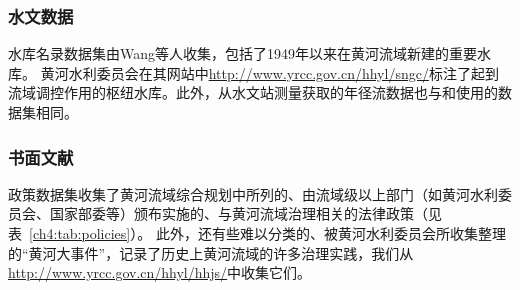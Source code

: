 \subsubsection*{水文数据}
水库名录数据集由Wang等人\cite{wang2019c}收集，包括了1949年以来在黄河流域新建的重要水库。
黄河水利委员会在其网站中\url{http://www.yrcc.gov.cn/hhyl/sngc/}标注了起到流域调控作用的枢纽水库。此外，从水文站测量获取的年径流数据也与\cite{wang2019c}和\cite{wang2016e}使用的数据集相同。

\subsubsection*{书面文献}

政策数据集收集了黄河流域综合规划中所列的、由流域级以上部门（如黄河水利委员会、国家部委等）颁布实施的、与黄河流域治理相关的法律政策\cite{shuilibuhuangheshuiliweiyuanhui}（见表~\ref{ch4:tab:policies}）。
此外，还有些难以分类的、被黄河水利委员会所收集整理的“黄河大事件”，记录了历史上黄河流域的许多治理实践，我们从\url{http://www.yrcc.gov.cn/hhyl/hhjs/}中收集它们。


